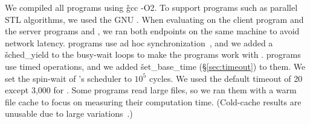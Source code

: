 We compiled all programs using \v{gcc -O2}.  To support
\openmp programs such as parallel STL algorithms, we used the GNU \libgomp.
When evaluating \xxx on the client program \aget and the server programs \openldap
and \redis, we ran both endpoints on the same machine to avoid network
latency.  \nprogadhocsync programs use ad hoc
synchronization~\cite{syncfinder:osdi10}, and we added a \v{sched\_yield}
to the busy-wait loops to make the programs work with \xxx.  \nprogtimeout
programs use \pthread timed operations, and we added \v{set\_base\_time}
(\S\ref{sec:timeout}) to them. We set the spin-wait of \xxx's scheduler
to $10^5$ cycles.  We used the default \compute timeout of 20 except 3,000
for \ferret.  Some \phoenix programs read large files, so
we ran them with a warm file cache to focus on measuring their computation
time. (Cold-cache results are unusable due to large
variations~\cite{Parrot:github}.)


